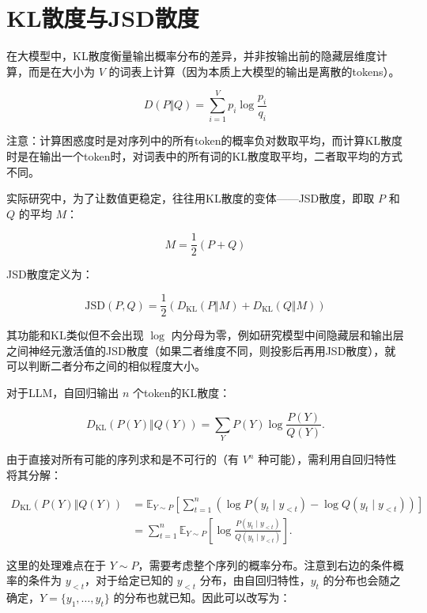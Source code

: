\setcounter{section}{6}

\hypertarget{klux6563ux5ea6ux4e0ejsdux6563ux5ea6}{%
\section{KL散度与JSD散度}\label{klux6563ux5ea6ux4e0ejsdux6563ux5ea6}}

在大模型中，KL散度衡量输出概率分布的差异，并非按输出前的隐藏层维度计算，而是在大小为 \(V\) 的词表上计算（因为本质上大模型的输出是离散的tokens）。

\[
D(P\Vert Q)=\sum_{i=1}^{V}p_i\log\frac{p_i}{q_i}
\]

注意：计算困惑度时是对序列中的所有token的概率负对数取平均，而计算KL散度时是在输出一个token时，对词表中的所有词的KL散度取平均，二者取平均的方式不同。

实际研究中，为了让数值更稳定，往往用KL散度的变体------JSD散度，即取 \(P\) 和 \(Q\) 的平均 \(M\)：

\[
M=\frac{1}{2}(P+Q)
\]

JSD散度定义为：

\[
\mathrm{JSD}(P,Q)=\frac{1}{2}\left(D_{\mathrm{KL}}(P\Vert M)+D_{\mathrm{KL}}(Q\Vert M)\right)
\]

其功能和KL类似但不会出现 \(\log\) 内分母为零，例如研究模型中间隐藏层和输出层之间神经元激活值的JSD散度（如果二者维度不同，则投影后再用JSD散度），就可以判断二者分布之间的相似程度大小。

对于LLM，自回归输出 \(n\) 个token的KL散度：

\[
D_{\mathrm{KL}}(P(Y)\Vert Q(Y))
=
\sum_Y P(Y)\log\frac{P(Y)}{Q(Y)}.
\]

由于直接对所有可能的序列求和是不可行的（有 \(V^n\) 种可能），需利用自回归特性将其分解：

\[
\begin{aligned}
D_{\mathrm{KL}}(P(Y)\Vert Q(Y))
&=\mathbb{E}_{Y\sim P}
\left[
\sum_{t=1}^{n}
\left(
\log P(y_t\mid y_{<t})-\log Q(y_t\mid y_{<t})
\right)
\right] \\
&=\sum_{t=1}^{n}
\mathbb{E}_{Y\sim P}
\left[
\log\frac{P(y_t\mid y_{<t})}{Q(y_t\mid y_{<t})}
\right].
\end{aligned}
\]

这里的处理难点在于 \(Y\sim P\)，需要考虑整个序列的概率分布。注意到右边的条件概率的条件为 \(y_{<t}\)，对于给定已知的 \(y_{<t}\) 分布，由自回归特性，\(y_t\) 的分布也会随之确定，\(Y=\{y_1,\ldots,y_t\}\) 的分布也就已知。因此可以改写为：

